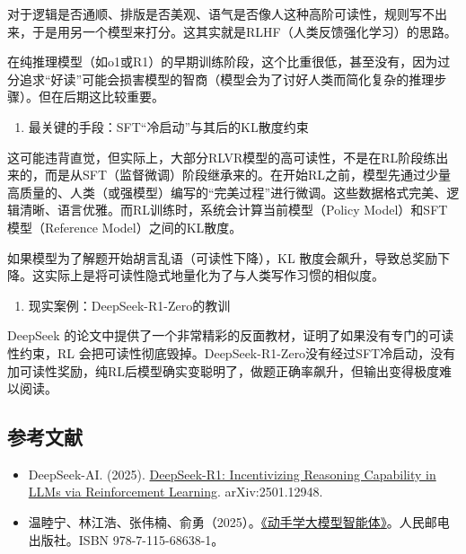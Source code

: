 对于逻辑是否通顺、排版是否美观、语气是否像人这种高阶可读性，规则写不出来，于是用另一个模型来打分。这其实就是RLHF（人类反馈强化学习）的思路。

在纯推理模型（如o1或R1）的早期训练阶段，这个比重很低，甚至没有，因为过分追求``好读''可能会损害模型的智商（模型会为了讨好人类而简化复杂的推理步骤）。但在后期这比较重要。

\begin{enumerate}
\def\labelenumi{\arabic{enumi}.}
\setcounter{enumi}{2}
\tightlist
\item
  最关键的手段：SFT``冷启动''与其后的KL散度约束
\end{enumerate}

这可能违背直觉，但实际上，大部分RLVR模型的高可读性，不是在RL阶段练出来的，而是从SFT（监督微调）阶段继承来的。在开始RL之前，模型先通过少量高质量的、人类（或强模型）编写的``完美过程''进行微调。这些数据格式完美、逻辑清晰、语言优雅。而RL训练时，系统会计算当前模型（Policy Model）和SFT模型（Reference Model）之间的KL散度。

如果模型为了解题开始胡言乱语（可读性下降），KL 散度会飙升，导致总奖励下降。这实际上是将可读性隐式地量化为了与人类写作习惯的相似度。

\begin{enumerate}
\def\labelenumi{\arabic{enumi}.}
\setcounter{enumi}{3}
\tightlist
\item
  现实案例：DeepSeek-R1-Zero的教训
\end{enumerate}

DeepSeek 的论文中提供了一个非常精彩的反面教材，证明了如果没有专门的可读性约束，RL 会把可读性彻底毁掉。DeepSeek-R1-Zero没有经过SFT冷启动，没有加可读性奖励，纯RL后模型确实变聪明了，做题正确率飙升，但输出变得极度难以阅读。

\hypertarget{ux53c2ux8003ux6587ux732e-82}{%
\subsection{参考文献}\label{ux53c2ux8003ux6587ux732e-82}}

\vspace{0.25em}
\begin{itemize}
\tightlist
\item
  DeepSeek-AI. (2025). \href{https://arxiv.org/abs/2501.12948}{DeepSeek-R1: Incentivizing Reasoning Capability in LLMs via Reinforcement Learning}. arXiv:2501.12948.
\item
  温睦宁、林江浩、张伟楠、俞勇（2025）。\href{https://haa.boyuai.com/}{《动手学大模型智能体》}。人民邮电出版社。ISBN 978-7-115-68638-1。
\end{itemize}

